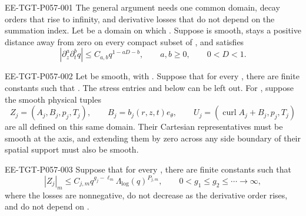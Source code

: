 %
\begin{EESegment}{EE-TGT-P057-001}
The general argument needs one common domain, decay orders that rise to infinity, and derivative losses that do not depend
on the summation index. Let  be a domain on which
. Suppose  is smooth, stays a positive distance away
from zero on every compact subset of , and satisfies
\begin{equation}
 |\partial_z^a\partial_t^bq|\leq C_{a,b}q^{1-aD-b},
 \qquad a,b\geq0,
 \qquad 0<D<1.
 \tag{5.28}\label{eq:5.28}
\end{equation}
\end{EESegment}

\begin{EESegment}{EE-TGT-P057-002}
Let  be smooth, with
. Suppose that for every , there are finite
constants  such that
. The stress entries
 and  below can be left out. For
, suppose the smooth physical tuples
\begin{equation}
 Z_j=(A_j,B_j,p_j,T_j),
 \qquad B_j=b_j(r,z,t)e_\theta,
 \qquad U_j=(\operatorname{curl}A_j+B_j,p_j,T_j)
 \tag{5.29}\label{eq:5.29}
\end{equation}
are all defined on this same domain. Their Cartesian representatives must be smooth at the axis, and extending them by
zero across any side boundary of their spatial support must also be smooth.
\end{EESegment}

\begin{EESegment}{EE-TGT-P057-003}
Suppose that for every , there are finite constants
 such that
\begin{equation}
 |Z_j|_m\leq C_{j,m}q^{g_j-\ell_m}\Lambda_{\log}(q)^{P_{j,m}},
 \qquad 0<g_1\leq g_2\leq\cdots\longrightarrow\infty,
 \tag{5.30}\label{eq:5.30}
\end{equation}
where the losses  are nonnegative, do not decrease as the derivative order rises, and do not depend on
.
\end{EESegment}

